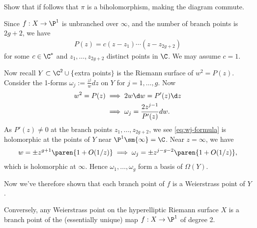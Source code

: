 \documentclass[11pt]{report}
\begin{document}
\begin{exercise}[]
Show that if follows that $\pi$ is a biholomorphism, making the diagram  commute.
\end{exercise}

\begin{rmk}
Since $f:X \to \P^1$ is unbranched over $\infty$, and the number of branch points is $2g+2$, we have
\begin{align*}
P(z)=c(z-z_1)\cdots (z-z_{2g+2})
\end{align*}
for some $c \in \C^*$ and $z_1,\dots,z_{2g+2}$ distinct points in $\C$. We may assume $c=1$.
\end{rmk}

Now recall $Y \subset \C^2 \cup \{$extra points$\}$ is the Riemann surface of $w^2=P(z)$. Consider the 1-forms $\omega_j :=\frac{z^j}{w}dz$ on $Y$ for $j = 1,\dots,g$. Now
\begin{align*}
w^2 = P(z) &\implies 2w\d w = P'(z) \d z \\ &\implies \omega_j = \frac{2z^{j-1}}{P'(z)}dw. \label{eq:wj-formula}
\end{align*}
As $P'(z)\neq 0$ at the branch points $z_1,\dots,z_{2g+2}$, we see \eqref{eq:wj-formula} is holomorphic at the points of $Y$ near $\P^1 \sm \{\infty\} = \C$. Near $z=\infty$, we have
\begin{align*}
w = \pm z^{g+1} \paren{1 + O(1/z)} \implies \omega_j = \pm z^{j-g-2}\paren{1+O(1/z)},
\end{align*}
which is holomorphic at $\infty$. Hence $\omega_1,\dots,\omega_g$ form a basis of $\Omega(Y)$. 

Now we've therefore shown that each branch point of $f$ is a Weierstrass point of $Y$.

\begin{claim}
Conversely, any Weierstrass point on the hyperelliptic Riemann surface $X$ is a branch point of the (essentially unique) map $f:X \to \P^1$ of degree 2.
\end{claim}
\end{document}
